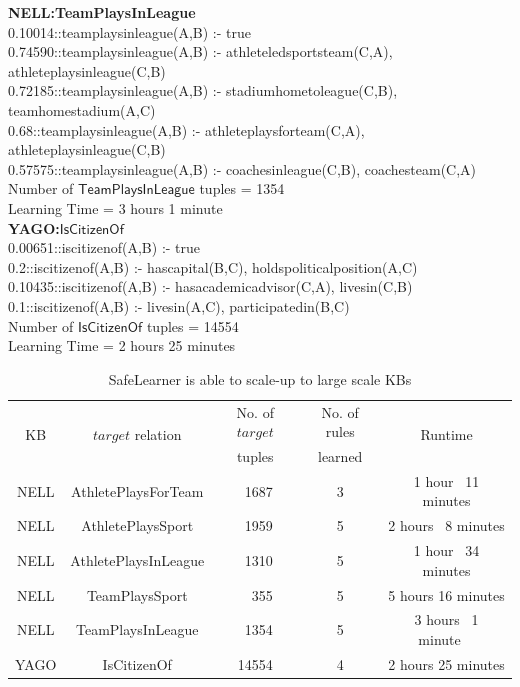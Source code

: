\documentclass[akbc,twoside,11pt]{article}
\newcommand{\algorithmname}{SafeLearner\xspace}
\begin{document}
\begin{footnotesize}
{\noindent \textbf{NELL:TeamPlaysInLeague} \\
0.10014::teamplaysinleague(A,B) :- true \\
0.74590::teamplaysinleague(A,B) :- athleteledsportsteam(C,A), athleteplaysinleague(C,B) \\
0.72185::teamplaysinleague(A,B) :- stadiumhometoleague(C,B), teamhomestadium(A,C) \\
0.68::teamplaysinleague(A,B) :- athleteplaysforteam(C,A), athleteplaysinleague(C,B) \\
0.57575::teamplaysinleague(A,B) :- coachesinleague(C,B), coachesteam(C,A) \\
Number of $\mathsf{TeamPlaysInLeague}$ tuples = 1354 \\
Learning Time = 3 hours 1 minute \\ %

\noindent \textbf{YAGO:$\mathsf{IsCitizenOf}$} \\
0.00651::iscitizenof(A,B) :- true \\
0.2::iscitizenof(A,B) :- hascapital(B,C), holdspoliticalposition(A,C) \\
0.10435::iscitizenof(A,B) :- hasacademicadvisor(C,A), livesin(C,B) \\
0.1::iscitizenof(A,B) :- livesin(A,C), participatedin(B,C) \\
Number of $\mathsf{IsCitizenOf}$ tuples = 14554 \\
Learning Time = 2 hours 25 minutes \\ %
}
\end{footnotesize}
\fi %

\begin{table}[H]
\centering
\begin{tabular}{|c|c|c|c|c|}
\hline
\multirow{2}{*}{KB} & \multirow{2}{*}{$target$ relation} & No. of $target$ & No. of rules & \multirow{2}{*}{Runtime}\\
 & & tuples & learned & \\
\hline
NELL & AthletePlaysForTeam	& \ 1687 & 3 & 1 hour \ 11 minutes \\
NELL & AthletePlaysSport	& \ 1959 & 5 & 2 hours \ 8 minutes \\
NELL & AthletePlaysInLeague & \ 1310 & 5 & 1 hour \ 34 minutes\\
NELL & TeamPlaysSport		& \ \ 355 & 5 & 5 hours 16 minutes \\
NELL & TeamPlaysInLeague	&\ 1354 & 5 & 3 hours \ 1 minute\ \ \\
YAGO & IsCitizenOf          &14554 & 4 & 2 hours 25 minutes \\
\hline
\end{tabular}
\caption{\algorithmname is able to scale-up to large scale KBs}\label{table:scaleup}
\end{table}
\end{document}
